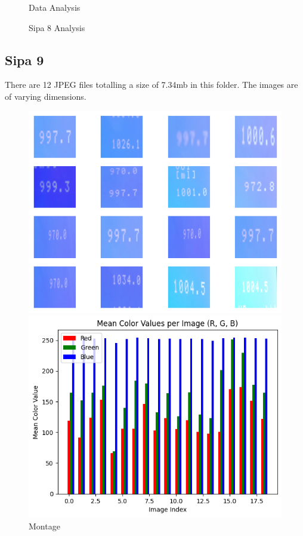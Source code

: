 \begin{figure}[ht]
\begin{minipage}[t]{0.50\textwidth}
        \caption*{Data Analysis}
    \end{minipage}
    \caption{Sipa 8 Analysis}
    \label{fig:Sipa 8 Analysis}
\end{figure}

\subsection{Sipa 9}

There are 12 JPEG files totalling a size of 7.34mb in this folder. The images are of varying dimensions.


\begin{figure}[ht]
    \centering
    \begin{minipage}[t]{0.25\textwidth}
        \centering
        \includegraphics[width=\textwidth]{Figures/EDA_Charts/9/montage.png}
        \caption*{Montage}
    \end{minipage}\hfill
    \begin{minipage}[t]{0.25\textwidth}
        \centering
        \includegraphics[width=\textwidth]{Figures/EDA_Charts/9/rgb.png}

\end{minipage}
\end{figure}
